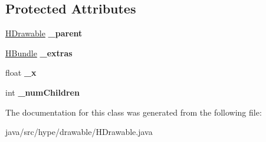 \subsection*{Protected Attributes}
\begin{DoxyCompactItemize}
\item 
\hypertarget{classhype_1_1drawable_1_1_h_drawable_a1f95d00444c6964efa4239ddf135a10e}{\hyperlink{classhype_1_1drawable_1_1_h_drawable}{H\-Drawable} {\bfseries \-\_\-parent}}\label{classhype_1_1drawable_1_1_h_drawable_a1f95d00444c6964efa4239ddf135a10e}

\item 
\hypertarget{classhype_1_1drawable_1_1_h_drawable_a77a64d01b7766ad4d0e338f82ab23f12}{\hyperlink{classhype_1_1util_1_1_h_bundle}{H\-Bundle} {\bfseries \-\_\-extras}}\label{classhype_1_1drawable_1_1_h_drawable_a77a64d01b7766ad4d0e338f82ab23f12}

\item 
\hypertarget{classhype_1_1drawable_1_1_h_drawable_a20c0ae16de46b74c903667ac2db1640a}{float {\bfseries \-\_\-x}}\label{classhype_1_1drawable_1_1_h_drawable_a20c0ae16de46b74c903667ac2db1640a}

\item 
\hypertarget{classhype_1_1drawable_1_1_h_drawable_a1e2205f639598af5f419b82ae5bdc0cf}{int {\bfseries \-\_\-num\-Children}}\label{classhype_1_1drawable_1_1_h_drawable_a1e2205f639598af5f419b82ae5bdc0cf}

\end{DoxyCompactItemize}


The documentation for this class was generated from the following file\-:\begin{DoxyCompactItemize}
\item 
java/src/hype/drawable/H\-Drawable.\-java\end{DoxyCompactItemize}
